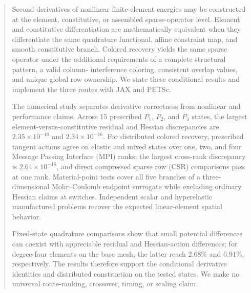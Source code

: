\begin{abstract}
Second derivatives of nonlinear finite-element energies may be constructed at
the element, constitutive, or assembled sparse-operator level. Element and
constitutive differentiation are mathematically equivalent when they
differentiate the same quadrature functional, affine constraint map, and smooth
constitutive branch. Colored recovery yields the same sparse operator under the
additional requirements of a complete structural pattern, a valid column-
interference coloring, consistent overlap values, and unique global row
ownership. We state these conditional results and implement the three routes
with JAX and PETSc.

The numerical study separates derivative correctness from nonlinear and
performance claims. Across 15 prescribed $P_1$, $P_2$, and $P_4$ states, the
largest element-versus-constitutive residual and Hessian discrepancies are
$2.35\times10^{-16}$ and $2.34\times10^{-16}$. For distributed colored
recovery, prescribed tangent actions agree on elastic and mixed states over
one, two, and four Message Passing Interface (MPI) ranks; the largest
cross-rank discrepancy is $2.64\times10^{-16}$, and direct compressed sparse
row (CSR) comparisons pass at one rank.
Material-point tests cover all five branches of a three-dimensional
Mohr--Coulomb endpoint surrogate while excluding ordinary Hessian claims at
switches. Independent scalar and hyperelastic manufactured problems recover
the expected linear-element spatial behavior.

Fixed-state quadrature comparisons show that small potential differences can
coexist with appreciable residual and Hessian-action differences; for
degree-four elements on the base mesh, the latter reach $2.68\%$ and
$6.91\%$, respectively. The results
therefore support the conditional derivative identities and distributed
construction on the tested states. We make no universal route-ranking,
crossover, timing, or scaling claim.
\end{abstract}
